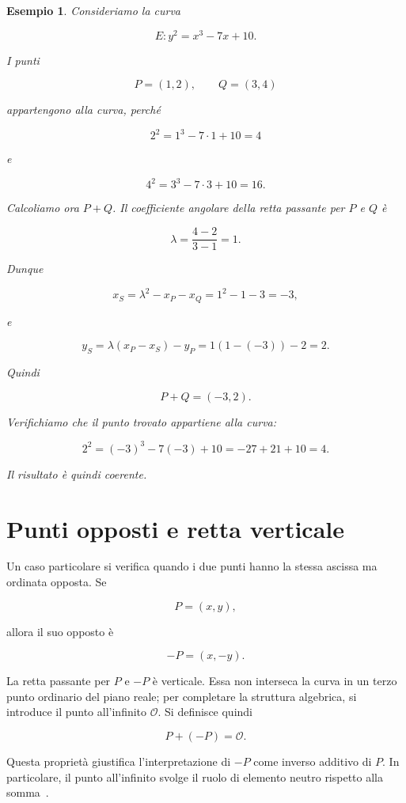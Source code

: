 \documentclass[12pt,a4paper,oneside]{report}
\newtheorem{example}{Esempio}[chapter]
\begin{document}
\begin{example}
Consideriamo la curva

\[
E: y^2 = x^3 - 7x + 10.
\]

I punti

\[
P=(1,2), \qquad Q=(3,4)
\]

appartengono alla curva, perché

\[
2^2 = 1^3 -7\cdot 1 +10 = 4
\]

e

\[
4^2 = 3^3 -7\cdot 3 +10 = 16.
\]

Calcoliamo ora \(P+Q\). Il coefficiente angolare della retta passante per \(P\) e \(Q\) è

\[
\lambda = \frac{4-2}{3-1} = 1.
\]

Dunque

\[
x_S = \lambda^2 - x_P - x_Q = 1^2 -1-3 = -3,
\]

e

\[
y_S = \lambda(x_P-x_S)-y_P = 1(1-(-3))-2 = 2.
\]

Quindi

\[
P+Q = (-3,2).
\]

Verifichiamo che il punto trovato appartiene alla curva:

\[
2^2 = (-3)^3 -7(-3)+10 = -27+21+10 = 4.
\]

Il risultato è quindi coerente.
\end{example}

\section{Punti opposti e retta verticale}

Un caso particolare si verifica quando i due punti hanno la stessa ascissa ma ordinata opposta. Se

\[
P=(x,y),
\]

allora il suo opposto è

\[
-P=(x,-y).
\]

La retta passante per \(P\) e \(-P\) è verticale. Essa non interseca la curva in un terzo punto ordinario del piano reale; per completare la struttura algebrica, si introduce il punto all'infinito \(\mathcal{O}\). Si definisce quindi

\begin{equation}
    P + (-P) = \mathcal{O}.
\end{equation}

Questa proprietà giustifica l'interpretazione di \(-P\) come inverso additivo di \(P\). In particolare, il punto all'infinito svolge il ruolo di elemento neutro rispetto alla somma~\cite{margara_ec}.
\end{document}
